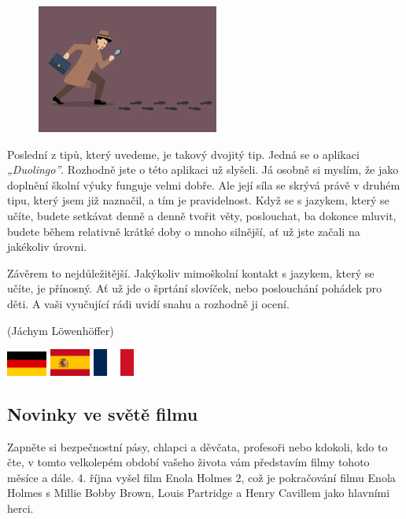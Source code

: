 \documentclass[12pt, a4paper]{article}
\begin{document}
\begin{multicols*}{2}
	\begin{figure}[H]
   		\centering
 		\includegraphics[width=.4\textwidth]{2}
	\end{figure}
		Poslední z tipů, který uvedeme, je takový dvojitý tip. Jedná se o aplikaci \emph{„Duolingo”}. Rozhodně jste o této aplikaci už slyšeli. Já osobně si myslím, že jako doplnění školní výuky funguje velmi dobře. Ale její síla se skrývá právě v druhém tipu, který jsem již naznačil, a tím je pravidelnost. Když se s jazykem, který se učíte, budete setkávat denně a denně tvořit věty, poslouchat, ba dokonce mluvit, budete během relativně krátké doby o mnoho silnější, ať už jste začali na jakékoliv úrovni. \par
		Závěrem to nejdůležitější. Jakýkoliv mimoškolní kontakt s jazykem, který se učíte, je přínosný. Ať už jde o šprtání slovíček, nebo poslouchání pohádek pro děti. A vaši vyučující rádi uvidí snahu a rozhodně ji ocení. 
		\par \begin{flushright}
			 \footnotesize (Jáchym Löwenhöffer)
		\end{flushright}
		\begin{multicols}{3}
			\begin{center}
				\includegraphics[width=0.1\textwidth]{G}
				\includegraphics[width=0.1\textwidth]{S}
				\includegraphics[width=0.1\textwidth]{FR}
			\end{center}
		\end{multicols}

		\begin{center}\section*{Novinky ve světě filmu} \end{center}
		Zapněte si bezpečnostní pásy, chlapci a děvčata, profesoři nebo kdokoli, kdo to čte, v tomto velkolepém období vašeho života vám představím filmy tohoto měsíce a dále. 4. října vyšel film Enola Holmes 2, což je pokračování filmu Enola Holmes s Millie Bobby Brown, Louis Partridge a Henry Cavillem jako hlavními herci. \par


\end{multicols*}
\end{document}
